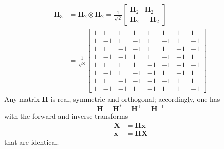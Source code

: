 \documentclass[\documentfontsize, twocolumn]{\classname}
\begin{document}
\begin{align*}
    \bm H_3 &= \bm H_2 \otimes \bm H_2 = \frac {1} {\sqrt 2}
    \begin{bmatrix}
    \bm H_2 & \bm H_2 \\
    \bm H_2 & - \bm H_2
    \end{bmatrix}\\
    &= \frac {1} {\sqrt 8}
    \begin{bmatrix}
        1 & 1 & 1 & 1 & 1 & 1 & 1 & 1\\
        1 & -1 & 1 & -1 & 1 & -1 & 1 & -1 \\
        1 & 1 & -1 & -1 & 1 & 1 & -1 & -1 \\
        1 & -1 & -1 & 1 & 1 & -1 & -1 & 1 \\
        1 & 1 & 1 & 1 & -1 & -1 & -1 & -1 \\
        1 & -1 & 1 & -1 & -1 & 1 & -1 & 1 \\
        1 & 1 & -1 & -1 & -1 & -1 & 1 & 1 \\
        1 & -1 & -1 & 1 & -1 & 1 & 1 & -1
    \end{bmatrix}
\end{align*}
Any matrix $\bm H$ is real, symmetric and orthogonal; accordingly, one has
\[
    \bm H = \bm H^* = \bm H^\top = \bm H^{-1}
\]
with the forward and inverse transforms
\begin{align*}
    \bm X &= \bm {Hx}\\
    \bm x &= \bm {HX}
\end{align*}
that are identical.
\end{document}
